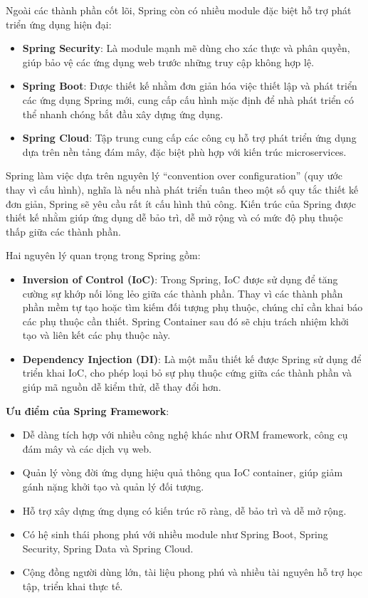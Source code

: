 Ngoài các thành phần cốt lõi, Spring còn có nhiều module đặc biệt hỗ trợ phát triển ứng dụng hiện đại:
\begin{itemize}
    \item \textbf{Spring Security}: Là module mạnh mẽ dùng cho xác thực và phân quyền, giúp bảo vệ các ứng dụng web trước những truy cập không hợp lệ.
    \item \textbf{Spring Boot}: Được thiết kế nhằm đơn giản hóa việc thiết lập và phát triển các ứng dụng Spring mới, cung cấp cấu hình mặc định để nhà phát triển có thể nhanh chóng bắt đầu xây dựng ứng dụng.
    \item \textbf{Spring Cloud}: Tập trung cung cấp các công cụ hỗ trợ phát triển ứng dụng dựa trên nền tảng đám mây, đặc biệt phù hợp với kiến trúc microservices.
\end{itemize}

Spring làm việc dựa trên nguyên lý ``convention over configuration'' (quy ước thay vì cấu hình), nghĩa là nếu nhà phát triển tuân theo một số quy tắc thiết kế đơn giản, Spring sẽ yêu cầu rất ít cấu hình thủ công. Kiến trúc của Spring được thiết kế nhằm giúp ứng dụng dễ bảo trì, dễ mở rộng và có mức độ phụ thuộc thấp giữa các thành phần.

Hai nguyên lý quan trọng trong Spring gồm:
\begin{itemize}
    \item \textbf{Inversion of Control (IoC)}: Trong Spring, IoC được sử dụng để tăng cường sự khớp nối lỏng lẻo giữa các thành phần. Thay vì các thành phần phần mềm tự tạo hoặc tìm kiếm đối tượng phụ thuộc, chúng chỉ cần khai báo các phụ thuộc cần thiết. Spring Container sau đó sẽ chịu trách nhiệm khởi tạo và liên kết các phụ thuộc này.
    \item \textbf{Dependency Injection (DI)}: Là một mẫu thiết kế được Spring sử dụng để triển khai IoC, cho phép loại bỏ sự phụ thuộc cứng giữa các thành phần và giúp mã nguồn dễ kiểm thử, dễ thay đổi hơn.
\end{itemize}

\textbf{Ưu điểm của Spring Framework}:
\begin{itemize}
    \item Dễ dàng tích hợp với nhiều công nghệ khác như ORM framework, công cụ đám mây và các dịch vụ web.
    \item Quản lý vòng đời ứng dụng hiệu quả thông qua IoC container, giúp giảm gánh nặng khởi tạo và quản lý đối tượng.
    \item Hỗ trợ xây dựng ứng dụng có kiến trúc rõ ràng, dễ bảo trì và dễ mở rộng.
    \item Có hệ sinh thái phong phú với nhiều module như Spring Boot, Spring Security, Spring Data và Spring Cloud.
    \item Cộng đồng người dùng lớn, tài liệu phong phú và nhiều tài nguyên hỗ trợ học tập, triển khai thực tế.
\end{itemize}

